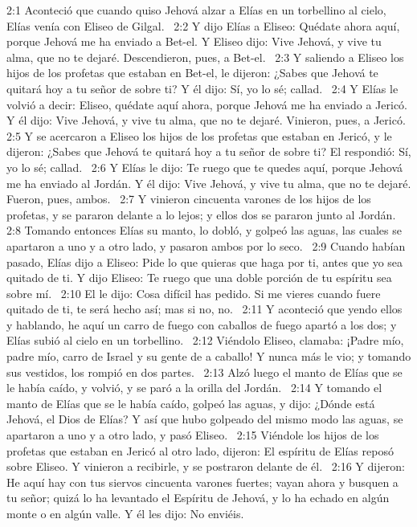 2:1 Aconteció que cuando quiso Jehová alzar a Elías en un torbellino al cielo, Elías venía con Eliseo de Gilgal.  
2:2 Y dijo Elías a Eliseo: Quédate ahora aquí, porque Jehová me ha enviado a Bet-el. Y Eliseo dijo: Vive Jehová, y vive tu alma, que no te dejaré. Descendieron, pues, a Bet-el.  
2:3 Y saliendo a Eliseo los hijos de los profetas que estaban en Bet-el, le dijeron: ¿Sabes que Jehová te quitará hoy a tu señor de sobre ti? Y él dijo: Sí, yo lo sé; callad.  
2:4 Y Elías le volvió a decir: Eliseo, quédate aquí ahora, porque Jehová me ha enviado a Jericó. Y él dijo: Vive Jehová, y vive tu alma, que no te dejaré. Vinieron, pues, a Jericó.  
2:5 Y se acercaron a Eliseo los hijos de los profetas que estaban en Jericó, y le dijeron: ¿Sabes que Jehová te quitará hoy a tu señor de sobre ti? El respondió: Sí, yo lo sé; callad.  
2:6 Y Elías le dijo: Te ruego que te quedes aquí, porque Jehová me ha enviado al Jordán. Y él dijo: Vive Jehová, y vive tu alma, que no te dejaré. Fueron, pues, ambos.  
2:7 Y vinieron cincuenta varones de los hijos de los profetas, y se pararon delante a lo lejos; y ellos dos se pararon junto al Jordán.  
2:8 Tomando entonces Elías su manto, lo dobló, y golpeó las aguas, las cuales se apartaron a uno y a otro lado, y pasaron ambos por lo seco.  
2:9 Cuando habían pasado, Elías dijo a Eliseo: Pide lo que quieras que haga por ti, antes que yo sea quitado de ti. Y dijo Eliseo: Te ruego que una doble porción de tu espíritu sea sobre mí.  
2:10 El le dijo: Cosa difícil has pedido. Si me vieres cuando fuere quitado de ti, te será hecho así; mas si no, no.  
2:11 Y aconteció que yendo ellos y hablando, he aquí un carro de fuego con caballos de fuego apartó a los dos; y Elías subió al cielo en un torbellino.  
2:12 Viéndolo Eliseo, clamaba: ¡Padre mío, padre mío, carro de Israel y su gente de a caballo! Y nunca más le vio; y tomando sus vestidos, los rompió en dos partes.  
2:13 Alzó luego el manto de Elías que se le había caído, y volvió, y se paró a la orilla del Jordán.  
2:14 Y tomando el manto de Elías que se le había caído, golpeó las aguas, y dijo: ¿Dónde está Jehová, el Dios de Elías? Y así que hubo golpeado del mismo modo las aguas, se apartaron a uno y a otro lado, y pasó Eliseo.  
2:15 Viéndole los hijos de los profetas que estaban en Jericó al otro lado, dijeron: El espíritu de Elías reposó sobre Eliseo. Y vinieron a recibirle, y se postraron delante de él.  
2:16 Y dijeron: He aquí hay con tus siervos cincuenta varones fuertes; vayan ahora y busquen a tu señor; quizá lo ha levantado el Espíritu de Jehová, y lo ha echado en algún monte o en algún valle. Y él les dijo: No enviéis.  
